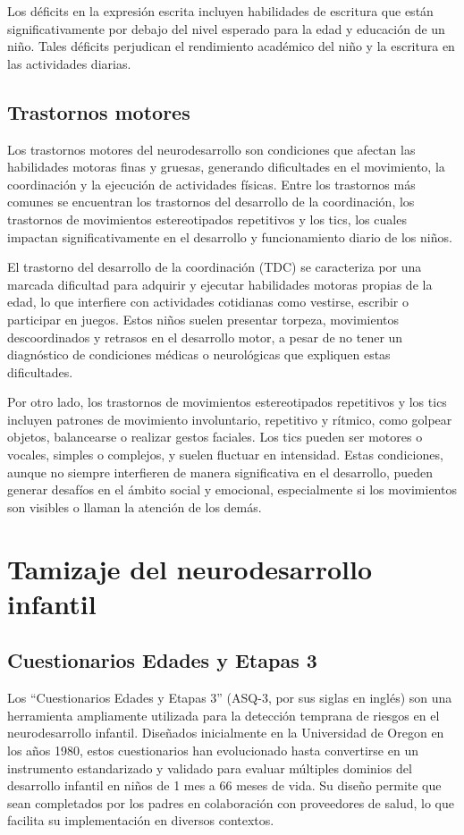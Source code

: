 \documentclass[11pt,letterpaper]{report}
\begin{document}
Los déficits en la expresión escrita incluyen habilidades de escritura que
están significativamente por debajo del nivel esperado para la edad y
educación de un niño. Tales déficits perjudican el rendimiento académico del
niño y la escritura en las actividades diarias.

\subsection{Trastornos motores}
Los trastornos motores del neurodesarrollo son condiciones que afectan las
habilidades motoras finas y gruesas, generando dificultades en el movimiento,
la coordinación y la ejecución de actividades físicas. Entre los trastornos más
comunes se encuentran los trastornos del desarrollo de la coordinación, los
trastornos de movimientos estereotipados repetitivos y los tics, los cuales
impactan significativamente en el desarrollo y funcionamiento diario de los
niños. \cite{DSM5TR}

El trastorno del desarrollo de la coordinación (TDC) se caracteriza por una
marcada dificultad para adquirir y ejecutar habilidades motoras propias de la
edad, lo que interfiere con actividades cotidianas como vestirse, escribir o
participar en juegos. Estos niños suelen presentar torpeza, movimientos
descoordinados y retrasos en el desarrollo motor, a pesar de no tener un
diagnóstico de condiciones médicas o neurológicas que expliquen estas
dificultades. \cite{DSM5TR}

Por otro lado, los trastornos de movimientos estereotipados repetitivos y los
tics incluyen patrones de movimiento involuntario, repetitivo y rítmico, como
golpear objetos, balancearse o realizar gestos faciales. Los tics pueden ser
motores o vocales, simples o complejos, y suelen fluctuar en intensidad. Estas
condiciones, aunque no siempre interfieren de manera significativa en el
desarrollo, pueden generar desafíos en el ámbito social y emocional,
especialmente si los movimientos son visibles o llaman la atención de los
demás. \cite{DSM5TR}

\section{Tamizaje del neurodesarrollo infantil}
\subsection{Cuestionarios Edades y Etapas 3}
Los ``Cuestionarios Edades y Etapas 3'' (ASQ-3, por sus siglas en inglés) son
una herramienta ampliamente utilizada para la detección temprana de riesgos en
el neurodesarrollo infantil. Diseñados inicialmente en la Universidad de Oregon
en los años 1980, estos cuestionarios han evolucionado hasta convertirse en un
instrumento estandarizado y validado para evaluar múltiples dominios del
desarrollo infantil en niños de 1 mes a 66 meses de vida. Su diseño permite que
sean completados por los padres en colaboración con proveedores de salud, lo
que facilita su implementación en diversos contextos.
\cite{Singh2017, ASQ4decades}
\end{document}
